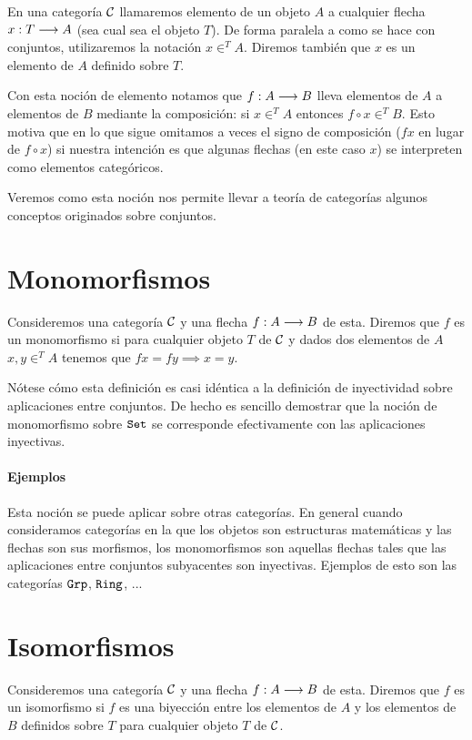 \begin{definition}
En una categoría $\mathcal{C}$ llamaremos elemento de un objeto $A$
a cualquier flecha $x : T\longrightarrow A$ (sea cual sea el objeto
$T$). De forma paralela a como se hace con conjuntos, utilizaremos
la notación $x \in^T A$. Diremos también que $x$ es un elemento
de $A$ definido sobre $T$.
\end{definition}

Con esta noción de elemento notamos que $f : A\longrightarrow B$ lleva
elementos de $A$ a elementos de $B$ mediante la composición: si
$x \in^T A$ entonces $f \circ x \in^T B$. Esto motiva que en lo que
sigue omitamos a veces el signo de composición ($f x$ en lugar
de $f \circ x$) si nuestra intención es
que algunas flechas (en este caso $x$) se interpreten
como elementos categóricos.

Veremos como esta noción nos permite llevar a teoría de categorías
algunos conceptos originados sobre conjuntos.

\section{Monomorfismos}
\begin{definition}
Consideremos una categoría $\mathcal{C}$ y una flecha $f : A\longrightarrow B$ de esta.
Diremos que $f$ es un monomorfismo si para cualquier objeto
$T$ de $\mathcal{C}$ y dados dos elementos de $A$
$x, y \in^T A$ tenemos que $fx = fy \implies x = y$.
\end{definition}

Nótese cómo esta definición es casi idéntica a la definición de
inyectividad sobre aplicaciones entre conjuntos. De hecho es sencillo
demostrar que la noción de monomorfismo sobre $\texttt{Set}$ se corresponde
efectivamente con las aplicaciones inyectivas.


\paragraph{Ejemplos}
Esta noción se puede aplicar sobre otras categorías. En general
cuando consideramos categorías en la que los objetos son estructuras
matemáticas y las flechas son sus morfismos, los monomorfismos son
aquellas flechas tales que las aplicaciones entre conjuntos subyacentes
son inyectivas. Ejemplos de esto son las categorías
$\texttt{Grp}$, $\texttt{Ring}$, ...

\section{Isomorfismos}
\begin{definition}
Consideremos una categoría $\mathcal{C}$ y una flecha $f : A\longrightarrow B$ de
esta. Diremos que $f$ es un isomorfismo si $f$ es una biyección
entre los elementos de $A$ y los elementos de $B$ definidos sobre
$T$ para cualquier objeto $T$ de $\mathcal{C}$.
\end{definition}

